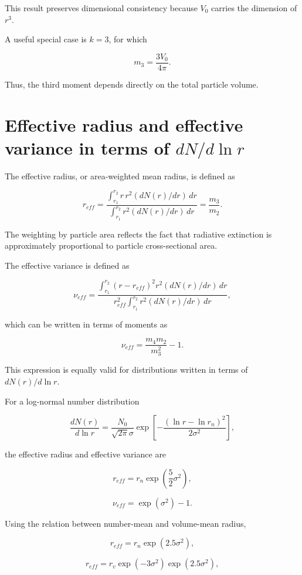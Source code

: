\documentclass[
  letterpaper,
  open=any]{scrbook}
\begin{document}
This result preserves dimensional consistency because \(V_0\) carries
the dimension of \(r^3\).

A useful special case is \(k=3\), for which

\[
m_3=\frac{3V_0}{4\pi}.
\]

Thus, the third moment depends directly on the total particle volume.

\section{\texorpdfstring{Effective radius and effective variance in
terms of
\(dN/d\ln r\)}{Effective radius and effective variance in terms of dN/d\textbackslash ln r}}\label{effective-radius-and-effective-variance-in-terms-of-dndln-r}

The effective radius, or area-weighted mean radius, is defined as

\[
r_{eff}=\frac{\int_{r_1}^{r_2} r \, r^2 (dN(r)/dr) \, dr}{\int_{r_1}^{r_2} r^2 (dN(r)/dr) \, dr}
=\frac{m_3}{m_2}.
\]

The weighting by particle area reflects the fact that radiative
extinction is approximately proportional to particle cross-sectional
area.

The effective variance is defined as

\[
\nu_{eff}=\frac{\int_{r_1}^{r_2}(r-r_{eff})^2 r^2 (dN(r)/dr) \, dr}
{r^2_{eff} \int_{r_1}^{r_2}r^2 (dN(r)/dr) \, dr},
\]

which can be written in terms of moments as

\[
\nu_{eff}= \frac{m_4 m_2}{m_3^2}-1.
\]

This expression is equally valid for distributions written in terms of
\(dN(r)/d\ln r\).

For a log-normal number distribution

\[
\frac{d N(r)}{d \ln r}=\frac{N_0}{\sqrt{2 \pi} \sigma} \exp\left[-\frac{(\ln r-\ln r_n)^2}{2 \sigma^2}\right],
\]

the effective radius and effective variance are

\[
r_{eff}=r_n \exp\left(\frac{5}{2} \sigma^2\right),
\]

\[
\nu_{eff}=\exp (\sigma^2)-1.
\]

Using the relation between number-mean and volume-mean radius,

\[
r_{eff}=r_n \exp(2.5 \sigma^2),
\]

\[
r_{eff}=r_v \exp(-3 \sigma^2) \exp(2.5 \sigma^2),
\]
\end{document}

